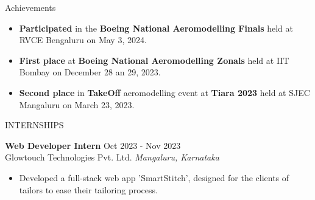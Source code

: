 \documentclass{resume} %
\begin{document}
\begin{rSection}{Achievements} 
    \begin{itemize}
        \item 	\textbf{Participated} in the \textbf{Boeing National Aeromodelling Finals} held at RVCE Bengaluru on May 3, 2024.

        \item 	\textbf{First place} at \textbf{Boeing National Aeromodelling Zonals} held at IIT Bombay on December 28 an 29, 2023.
        \item 	\textbf{Second place} in \textbf{TakeOff} aeromodelling event at \textbf{Tiara 2023} held at SJEC Mangaluru on March 23, 2023.
        
    \end{itemize}
    
    
    \end{rSection}



\begin{rSection}{INTERNSHIPS}

\textbf{Web Developer Intern} \hfill Oct 2023 - Nov 2023\\
Glowtouch Technologies Pvt. Ltd. \hfill \textit{Mangaluru, Karnataka}
 \begin{itemize}
    \itemsep -3pt {} 
    \item Developed a full-stack web app 'SmartStitch', designed for the clients of tailors to ease their tailoring process. 
 \end{itemize}
 
\end{rSection} 



\end{document}
